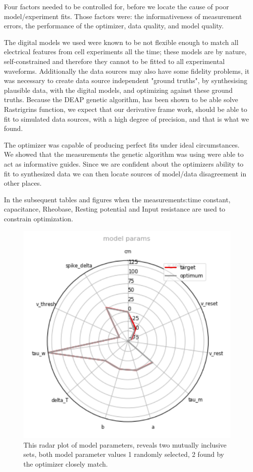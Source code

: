 




Four factors needed to be controlled for, before we locate the cause of poor model/experiment fits. Those factors were: the informativeness of measurement errors, the performance of the optimizer, data quality, and model quality.

The digital models we used were known to be not flexible enough to match all electrical features from cell experiments all the time; these models are by nature, self-constrained and therefore they cannot to be fitted to all experimental waveforms. Additionally the data sources may also have some fidelity problems, it was necessary to create data source independent "ground truths", by synthesising plausible data, with the digital models, and optimizing against these ground truths. Because the DEAP genetic algorithm, has been shown to be able solve Rastrigrins function, we expect that our derivative frame work, should be able to fit to simulated data sources, with a high degree of precision, and that is what we found.

The optimizer was capable of producing perfect fits under ideal circumstances. We showed that the measurements the genetic algorithm was using were able to act as informative guides. Since we are confident about the optimizers ability to fit to synthesized data we can then locate sources of model/data disagreement in other places. 

In the subsequent tables and figures when the measurements:time constant, capacitance, Rheobase, Resting potential and Input resistance are used to constrain optimization.
\begin{figure}
    \centering
    \includegraphics{figures/radar_coordinates.png}
    \caption{This radar plot of model parameters, reveals two mutually inclusive sets, both model parameter values 1 randomly selected, 2 found by the optimizer closely match.}
    \label{fig:my_label}
\end{figure}


